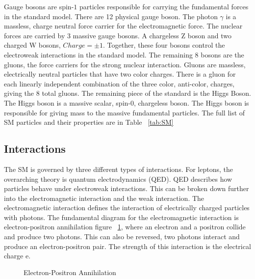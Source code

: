 \indent Gauge bosons are spin-${1}$ particles responsible for carrying the fundamental forces in the standard model. There are 12 physical gauge boson. The photon ${\gamma}$ is a massless, charge neutral force carrier for the electromagnetic force. The nuclear forces are carried by 3 massive gauge bosons. A chargeless Z boson and two charged W bosons, ${Charge = \pm 1}$. Together, these four bosons control the electroweak interactions in the standard model. The remaining 8 bosons are the gluons, the force carriers for the strong nuclear interaction. Gluons are massless, electrically neutral particles that have two color charges. There is a gluon for each linearly independent combination of the three color, anti-color, charges, giving the 8 total gluons. \linebreak
\indent The remaining piece of the standard is the Higgs Boson. The Higgs boson is a massive scalar, spin-${0}$, chargeless boson. The Higgs boson is responsible for giving mass to the massive fundamental particles. The full list of SM particles and their properties are in Table ~\ref{tab:SM}\linebreak
\subsection{Interactions}
The SM is governed by three different types of interactions. For leptons, the overarching theory is quantum electrodynamics (QED). QED describes how particles behave under electroweak interactions. This can be broken down further into the electromagnetic interaction and the weak interaction. The electromagnetic interaction defines the interaction of electrically charged particles with photons. The fundamental diagram for the electromagnetic interaction is electron-positron annihilation figure ~\ref{Fey:e-p}, where an electron and a positron collide and produce two photons. This can also be reversed, two photons interact and produce an electron-positron pair. The strength of this interaction is the electrical charge e. \linebreak

\begin{figure}[h]
\begin{center}
\caption{Electron-Positron Annihilation}
\label{Fey:e-p}
\end{center}
\end{figure}

